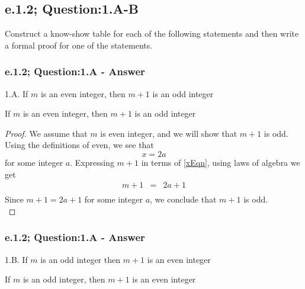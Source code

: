 \newpage
\subsection{e.1.2; Question:1.A-B}

Construct a know-show table for each of the following statements and then write a formal proof for one of the statements. \\

\subsubsection*{e.1.2; Question:1.A - Answer}
1.A. If $m$ is an even integer, then $m+1$ is an odd integer \\

\begin{tcolorbox}
\begin{theorem}
If $m$ is an even integer, then $m + 1$ is an odd integer
\end{theorem}
\end{tcolorbox}

\begin{proof}
We assume that $m$ is even integer, and  we will show that $m + 1$ is odd. Using the definitions of even, we see that
\begin{equation}
\label{xEqn}
x = 2a
\end{equation}
for some integer $a$. Expressing $m+1$ in terms of \ref{xEqn}, using laws of algebra we get
\begin{eqnarray*}
m + 1 & = & 2a + 1 \nonumber \\
\end{eqnarray*}
Since $m+1 = 2a+1$ for some integer $a$, we conclude that $m+1$ is odd. \\
\end{proof}


\subsubsection*{e.1.2; Question:1.A - Answer}
1.B. If $m$ is an odd integer then $m+1$ is an even integer \\

\begin{tcolorbox}
\begin{theorem}
If $m$ is an odd integer, then $m + 1$ is an even integer
\end{theorem}
\end{tcolorbox}

